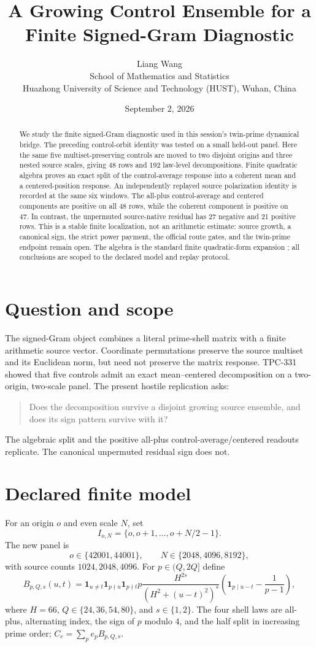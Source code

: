 \documentclass[10pt]{article}
\title{A Growing Control Ensemble for a Finite Signed-Gram Diagnostic}
\author{Liang Wang\\School of Mathematics and Statistics\\Huazhong University of Science and Technology (HUST), Wuhan, China}
\date{September 2, 2026}
\newcommand{\ind}{\mathbf 1}
\begin{document}
\maketitle

\begin{abstract}
We study the finite signed-Gram diagnostic used in this session's twin-prime
dynamical bridge.  The preceding control-orbit identity was tested on a
small held-out panel.  Here the same five multiset-preserving controls are
moved to two disjoint origins and three nested source scales, giving 48 rows
and 192 law-level decompositions.  Finite quadratic algebra proves an exact
split of the control-average response into a coherent mean and a
centered-position response.  An independently replayed source polarization
identity is recorded at the same six windows.  The all-plus control-average
and centered components are positive on all 48 rows, while the coherent
component is positive on 47.  In contrast, the unpermuted source-native
residual has 27 negative and 21 positive rows.  This is a stable finite
localization, not an arithmetic estimate: source growth, a canonical sign,
the strict power payment, the official route gates, and the twin-prime
endpoint remain open.  The algebra is the standard finite quadratic-form
expansion \cite{horn2013matrix}; all conclusions are scoped to the declared
model and replay protocol.
\end{abstract}

\section{Question and scope}
The signed-Gram object combines a literal prime-shell matrix with a finite
arithmetic source vector.  Coordinate permutations preserve the source
multiset and its Euclidean norm, but need not preserve the matrix response.
TPC-331 showed that five controls admit an exact mean--centered decomposition
on a two-origin, two-scale panel.  The present hostile replication asks:
\begin{quote}
Does the decomposition survive a disjoint growing source ensemble, and does
its sign pattern survive with it?
\end{quote}
The algebraic split and the positive all-plus control-average/centered
readouts replicate.  The canonical unpermuted residual sign does not.

\section{Declared finite model}
For an origin $o$ and even scale $N$, set
\[
 I_{o,N}=\{o,o+1,\ldots,o+N/2-1\}.
\]
The new panel is
\[
 o\in\{42001,44001\},\qquad N\in\{2048,4096,8192\},
\]
with source counts $1024,2048,4096$.  For $p\in(Q,2Q]$ define
\begin{equation}\label{eq:block}
 B_{p,Q,s}(u,t)=\ind_{u\ne t}\ind_{p\nmid u}\ind_{p\nmid t}
 p\frac{H^{2s}}{(H^2+(u-t)^2)^s}
 \left(\ind_{p\mid u-t}-\frac1{p-1}\right),
\end{equation}
where $H=66$, $Q\in\{24,36,54,80\}$, and $s\in\{1,2\}$.  The four
shell laws are all-plus, alternating index, the sign of $p$ modulo $4$, and
the half split in increasing prime order; $C_e=\sum_p e_pB_{p,Q,s}$.
\end{document}
